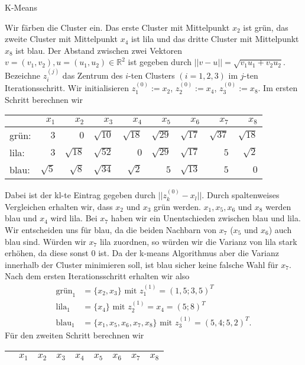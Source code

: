 \begin{task}[credit=6]{K-Means}
\begin{subtask}[points=6,title={K-Means Algorithmus}]
\begin{solution}
Wir färben die Cluster ein. Das erste Cluster mit Mittelpunkt $x_2$ ist grün, das zweite Cluster mit Mittelpunkt $x_4$ ist lila und das dritte Cluster mit Mittelpunkt $x_8$ ist blau. Der Abstand zwischen zwei Vektoren $v = (v_1, v_2), u = (u_1, u_2) \in \mathbb{R}^2$ ist gegeben durch $||v-u||= \sqrt{v_1u_1 + v_2u_2}$. Bezeichne $z_i^{(j)}$ das Zentrum des $i$-ten Clusters $(i = 1,2,3)$ im $j$-ten Iterationsschritt. Wir initialisieren $z_1^{(0)} := x_2$, $z_2^{(0)} := x_4$, $z_3^{(0)} := x_8$. Im ersten Schritt berechnen wir \begin{center}
\begin{tabular}{l|rrrrrrrr}
	      & $x_1$ & $x_2$ & $x_3$ & $x_4$ & $x_5$ & $x_6$ & $x_7$ & $x_8$ \\ \hline
	grün: & $3$ & $0$ & $\sqrt{10}$ & $\sqrt{18}$ & $\sqrt{29}$ & $\sqrt{17}$ & $\sqrt{37}$ & $\sqrt{18}$  \\
	lila: & $3$ & $\sqrt{18}$ & $\sqrt{52}$ & $0$ & $\sqrt{29}$ & $\sqrt{17}$ & $5$ & $\sqrt{2}$ \\
	blau: & $\sqrt{5}$ & $\sqrt{8}$ & $\sqrt{34}$ & $\sqrt{2}$ & $5$ & $\sqrt{13}$ & $5$ & $0$
\end{tabular}
\end{center} 
Dabei ist der kl-te Eintrag gegeben durch $||z_k^{(0)}-x_l||$. Durch spaltenweises Vergleichen erhalten wir, dass $x_2$ und $x_3$ grün werden. $x_1, x_5,x_6$ und $x_8$ werden blau und $x_4$ wird lila. Bei $x_7$ haben wir ein Unentschieden zwischen blau und lila. Wir entscheiden uns für blau, da die beiden Nachbarn von $x_7$ ($x_5$ und $x_6$) auch blau sind. Würden wir $x_7$ lila zuordnen, so würden wir die Varianz von lila stark erhöhen, da diese sonst 0 ist. Da der k-means Algorithmus aber die Varianz innerhalb der Cluster minimieren soll, ist blau sicher keine falsche Wahl für $x_7$. \\ Nach dem ersten Iterationsschritt erhalten wir also \begin{align*}
\text{grün}_1 &= \{x_2, x_3\} \text{ mit } z_1^{(1)} = (1,5; 3,5)^T \\
\text{lila}_1 &= \{x_4\} \text{ mit } z_2^{(1)} = x_4 = (5;8)^T \\
\text{blau}_1 &= \{x_1, x_5, x_6, x_7, x_8\} \text{ mit } z_3^{(1)} = (5,4;5,2)^T.
\end{align*}
Für den zweiten Schritt berechnen wir \begin{center}
	\begin{tabular}{l|rrrrrrrr}
		& $x_1$ & $x_2$ & $x_3$ & $x_4$ & $x_5$ & $x_6$ & $x_7$ & $x_8$ \\ \hline

\end{tabular}
\end{center}
\end{solution}
\end{subtask}
\end{task}

